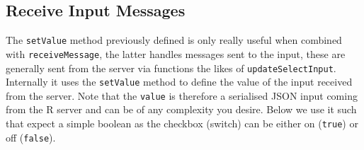 \documentclass[
]{krantz}
\makeatletter
\newenvironment{Shaded}{\begin{snugshade}}{\end{snugshade}}
\newcommand{\AttributeTok}[1]{\textcolor[rgb]{0.61,0.61,0.61}{#1}}
\newcommand{\CommentTok}[1]{\textcolor[rgb]{0.37,0.37,0.37}{\textit{#1}}}
\newcommand{\ControlFlowTok}[1]{\textcolor[rgb]{0.27,0.27,0.27}{\textbf{#1}}}
\newcommand{\DataTypeTok}[1]{\textcolor[rgb]{0.27,0.27,0.27}{#1}}
\newcommand{\KeywordTok}[1]{\textcolor[rgb]{0.27,0.27,0.27}{\textbf{#1}}}
\newcommand{\NormalTok}[1]{#1}
\newcommand{\OperatorTok}[1]{\textcolor[rgb]{0.43,0.43,0.43}{\textbf{#1}}}
\newcommand{\StringTok}[1]{\textcolor[rgb]{0.5,0.5,0.5}{#1}}
\newcommand{\VariableTok}[1]{\textcolor[rgb]{0,0,0}{#1}}
\newenvironment{kframe}{%
\medskip{}
\setlength{\fboxsep}{.8em}
 \def\at@end@of@kframe{}%
 \ifinner\ifhmode%
  \def\at@end@of@kframe{\end{minipage}}%
  \begin{minipage}{\columnwidth}%
 \fi\fi%
 \def\FrameCommand##1{\hskip\@totalleftmargin \hskip-\fboxsep
 \colorbox{shadecolor}{##1}\hskip-\fboxsep
     \hskip-\linewidth \hskip-\@totalleftmargin \hskip\columnwidth}%
 \MakeFramed {\advance\hsize-\width
   \@totalleftmargin\z@ \linewidth\hsize
   \@setminipage}}%
 {\par\unskip\endMakeFramed%
 \at@end@of@kframe}
\renewenvironment{Shaded}{\begin{kframe}}{\end{kframe}}
\makeatother
\begin{document}
\hypertarget{shiny-input-receive-msg}{%
\subsection{Receive Input Messages}\label{shiny-input-receive-msg}}

The \texttt{setValue} method previously defined is only really useful when combined with \texttt{receiveMessage}, the latter handles messages sent to the input, these are generally sent from the server via functions the likes of \texttt{updateSelectInput}. Internally it uses the \texttt{setValue} method to define the value of the input received from the server. Note that the \texttt{value} is therefore a serialised JSON input coming from the R server and can be of any complexity you desire. Below we use it such that expect a simple boolean as the checkbox (switch) can be either on (\texttt{true}) or off (\texttt{false}).

\begin{Shaded}
\end{Shaded}
\end{document}

